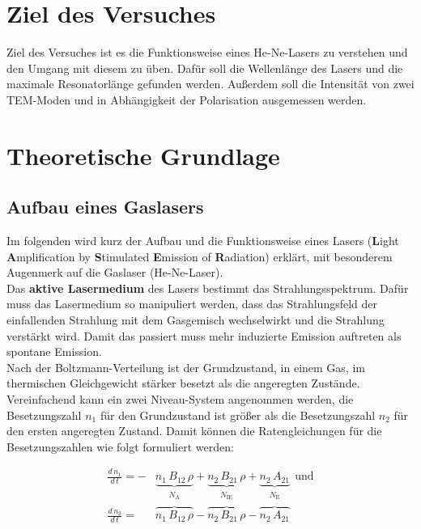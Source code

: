 \section{Ziel des Versuches}
Ziel des Versuches ist es die Funktionsweise eines He-Ne-Lasers zu verstehen und den Umgang mit diesem zu üben. Dafür soll die Wellenlänge des Lasers und die maximale Resonatorlänge gefunden werden. Außerdem soll die Intensität von zwei TEM-Moden und in Abhängigkeit der Polarisation ausgemessen werden.


\section{Theoretische Grundlage}
\subsection{Aufbau eines Gaslasers}
Im folgenden wird kurz der Aufbau und die Funktionsweise eines Lasers (\textbf{L}ight \textbf{A}mplification by \textbf{S}timulated \textbf{E}mission of \textbf{R}adiation) erklärt, mit besonderem Augenmerk auf die Gaslaser (He-Ne-Laser). \\
Das \textbf{aktive Lasermedium} des Lasers bestimmt das Strahlungsspektrum. Dafür muss das Lasermedium so manipuliert werden, dass das Strahlungsfeld der einfallenden Strahlung mit dem Gasgemisch wechselwirkt und die Strahlung verstärkt wird. Damit das passiert muss mehr induzierte Emission auftreten als spontane Emission. \\
Nach der Boltzmann-Verteilung ist der Grundzustand, in einem Gas, im thermischen Gleichgewicht stärker besetzt als die angeregten Zustände. Vereinfachend kann ein zwei Niveau-System angenommen werden, die Besetzungszahl $n_1$ für den Grundzustand ist größer als die Besetzungszahl $n_2$ für den ersten angeregten Zustand. Damit können die Ratengleichungen für die Besetzungszahlen wie folgt formuliert werden:

\begin{align}
	\frac{d\,n_1}{d\,t} = - &\underbrace{n_1\,B_{12}\,\rho}_{\dot{N}_\text{A}} + \underbrace{n_2\,B_{21}\,\rho}_{\dot{N}_\text{IE}} + \underbrace{n_2\,A_{21}}_{\dot{N}_\text{E}}\ \ \text{und}\\
	\frac{d\,n_2}{d\,t} = \ \ \ &\overbrace{n_1\,B_{12}\,\rho}_{} - \overbrace{n_2\,B_{21}\,\rho}_{} - \overbrace{n_2\,A_{21}}_{}
\end{align}

